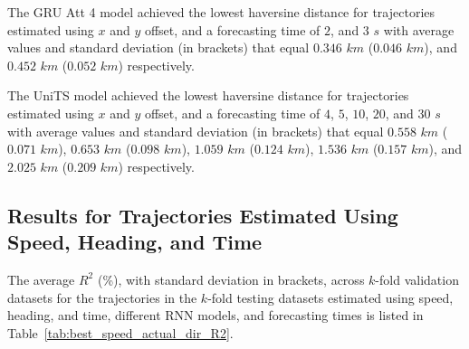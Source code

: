 The GRU Att 4 model achieved the lowest haversine distance for trajectories estimated using $x$ and $y$ offset, and a forecasting time of $2$, and $3$ $s$ with average values and standard deviation (in brackets) that equal $0.346$ $km$ ($0.046$ $km$), and $0.452$ $km$ ($0.052$ $km$) respectively.

The UniTS model achieved the lowest haversine distance for trajectories estimated using $x$ and $y$ offset, and a forecasting time of $4$, $5$, $10$, $20$, and $30$ $s$ with average values and standard deviation (in brackets) that equal $0.558$ $km$ ($0.071$ $km$), $0.653$ $km$ ($0.098$ $km$), $1.059$ $km$ ($0.124$ $km$), $1.536$ $km$ ($0.157$ $km$), and $2.025$ $km$ ($0.209$ $km$) respectively.

\subsection{Results for Trajectories Estimated Using Speed, Heading, and Time}

The average $R^{2}$ (\%), with standard deviation in brackets, across $k$-fold validation datasets for the trajectories in the $k$-fold testing datasets estimated using speed, heading, and time, different RNN models, and forecasting times is listed in Table~\ref{tab:best_speed_actual_dir_R2}.

